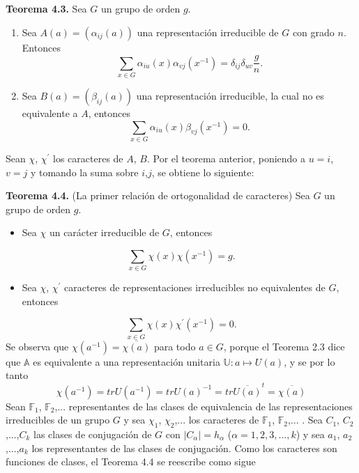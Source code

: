 \documentclass[12pt]{book}
\theoremstyle{definition}
\newcounter{in}
\begin{document}
\textbf{Teorema 4.3. } Sea $G$ un grupo de orden $g$.
\begin{enumerate}
\item Sea $A(a)=(\alpha_{ij}(a))$ una representación irreducible de
  $G$ con grado $n$. Entonces
  \begin{equation*}
    \sum_{x \in G} \alpha_{iu}(x) \alpha_{vj}(x^{-1}) = \delta_{ij} \delta_{uv}\frac{g}{n}.
  \end{equation*}
\item Sea $ B(a)=(\beta_{ij}(a))$ una representación irreducible, la
  cual no es equivalente a $A$, entonces
  \begin{equation*}
    \sum_{x \in G} \alpha_{iu}(x) \beta_{vj}(x^{-1}) = 0.
  \end{equation*}
\end{enumerate}
Sean $\chi$, $\chi^{'}$ los caracteres de $A$, $B$. Por el teorema
anterior, poniendo a $u=i$, $v=j$ y tomando la suma sobre $i$,$j$, se
obtiene lo siguiente:

\textbf{Teorema 4.4. } (La primer relación de ortogonalidad de
caracteres) Sea $G$ un grupo de orden $g$.
\begin{itemize}
\item Sea $\chi$ un carácter irreducible de $G$, entonces 
\end{itemize}
\begin{equation*}
\sum_{x \in G} \chi(x) \chi(x^{-1}) = g.
\end{equation*}
\begin{itemize}
\item Sea $\chi$, $\chi^{'}$ caracteres de representaciones
  irreducibles no equivalentes de $G$, entonces
\end{itemize}
\begin{equation*}
\sum_{x \in G} \chi(x) \chi^{'}(x^{-1}) = 0.
\end{equation*}
Se observa que $\chi(a^{-1})=\overline{\chi(a)}$ para todo $a \in G$,
porque el Teorema 2.3 dice que $\mathbb{A}$ es equivalente a una
representación unitaria $\mathbb{U}\colon a \mapsto U(a)$, y se por lo
tanto
\begin{equation*} \label{4.5}
\chi(a^{-1})=trU(a^{-1})=trU(a)^{-1}=tr \overline{U(a)}^{t} = \overline{\chi(a)}  
\end{equation*} 
Sean $\mathbb{F}_{1}$, $\mathbb{F}_{2}$,... representantes de las
clases de equivalencia de las representaciones irreducibles de un
grupo $G$ y sea $\chi_{1}$, $\chi_{2}$,... los caracteres de
$\mathbb{F}_{1}$, $\mathbb{F}_{2}$,... .  Sea $C_{1}$,
$C_{2}$,...,$C_{k}$ las clases de conjugación de $G$ con
$|C_{\alpha}|=h_{\alpha}$ ($\alpha=1, 2, 3,...,k$) y sea $a_{1}$,
$a_{2}$,...,$a_{k}$ los representantes de las clases de
conjugación. Como los caracteres son funciones de clases, el Teorema
4.4 se reescribe como sigue
\end{document}
